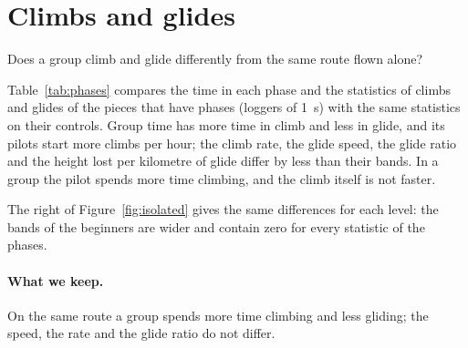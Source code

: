 \section{Climbs and glides}\label{sec:phases}

Does a group climb and glide differently from the same route flown alone?

Table~\ref{tab:phases} compares the time in each phase and the statistics of climbs and glides of the
pieces that have phases (loggers of 1~s) with the same statistics on their controls. Group time has
more time in climb and less in glide, and its pilots start more climbs per hour; the climb rate, the
glide speed, the glide ratio and the height lost per kilometre of glide differ by less than their
bands. In a group the pilot spends more time climbing, and the climb itself is not faster.

\begin{table}
\centering\small

\caption{Climbs and glides of group time and of the same route flown alone, both wing levels
together; the difference group minus control with its 5--95\% band. Times are shares of the time
flown, in \%, and their differences are in percentage points.}
\label{tab:phases}
\end{table}

The right of Figure~\ref{fig:isolated} gives the same differences for each level: the bands of the
beginners are wider and contain zero for every statistic of the phases.

\paragraph{What we keep.} On the same route a group spends more time climbing and less gliding;
the speed, the rate and the glide ratio do not differ.
